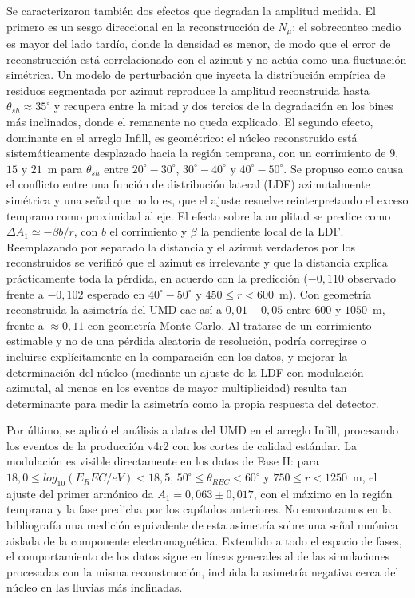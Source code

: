 Se caracterizaron también dos efectos que degradan la amplitud medida. El primero es un sesgo direccional en la reconstrucción de $N_\mu$: el sobreconteo medio es mayor del lado tardío, donde la densidad es menor, de modo que el error de reconstrucción está correlacionado con el azimut y no actúa como una fluctuación simétrica. Un modelo de perturbación que inyecta la distribución empírica de residuos segmentada por azimut reproduce la amplitud reconstruida hasta $\theta_{sh} \approx 35^\circ$ y recupera entre la mitad y dos tercios de la degradación en los bines más inclinados, donde el remanente no queda explicado. El segundo efecto, dominante en el arreglo Infill, es geométrico: el núcleo reconstruido está sistemáticamente desplazado hacia la región temprana, con un corrimiento de $9$, $15$ y $21$~m para $\theta_{sh}$ entre $20^\circ-30^\circ$, $30^\circ-40^\circ$ y $40^\circ-50^\circ$. Se propuso como causa el conflicto entre una función de distribución lateral (LDF) azimutalmente simétrica y una señal que no lo es, que el ajuste resuelve reinterpretando el exceso temprano como proximidad al eje. El efecto sobre la amplitud se predice como $\Delta A_1 \simeq -\beta b/r$, con $b$ el corrimiento y $\beta$ la pendiente local de la LDF. Reemplazando por separado la distancia y el azimut verdaderos por los reconstruidos se verificó que el azimut es irrelevante y que la distancia explica prácticamente toda la pérdida, en acuerdo con la predicción ($-0,110$ observado frente a $-0,102$ esperado en $40^\circ-50^\circ$ y $450 \leq r < 600$~m). Con geometría reconstruida la asimetría del UMD cae así a $0,01-0,05$ entre $600$ y $1050$~m, frente a $\approx0,11$ con geometría Monte Carlo. Al tratarse de un corrimiento estimable y no de una pérdida aleatoria de resolución, podría corregirse o incluirse explícitamente en la comparación con los datos, y mejorar la determinación del núcleo (mediante un ajuste de la LDF con modulación azimutal, al menos en los eventos de mayor multiplicidad) resulta tan determinante para medir la asimetría como la propia respuesta del detector.

Por último, se aplicó el análisis a datos del UMD en el arreglo Infill, procesando los eventos de la producción v4r2 con los cortes de calidad estándar. La modulación es visible directamente en los datos de Fase II: para $18,0 \leq log_{10}(E_REC/eV) < 18,5$, $50^\circ \leq \theta_{REC} < 60^\circ$ y $750 \leq r < 1250$~m, el ajuste del primer armónico da $A_1 = 0,063 \pm 0,017$, con el máximo en la región temprana y la fase predicha por los capítulos anteriores. No encontramos en la bibliografía una medición equivalente de esta asimetría sobre una señal muónica aislada de la componente electromagnética. Extendido a todo el espacio de fases, el comportamiento de los datos sigue en líneas generales al de las simulaciones procesadas con la misma reconstrucción, incluida la asimetría negativa cerca del núcleo en las lluvias más inclinadas.

